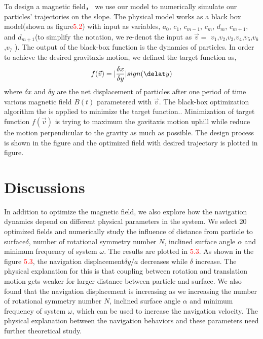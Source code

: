 To design a magnetic field， we use our model to numerically simulate our particles' trajectories on the slope. The physical model works as a black box model(shown as figure\textcolor{red}{5.2}) with input as variables, $a_0$, $c_1$, $c_{m-1}$, $c_{m}$, $d_{m}$, $c_{m+1}$, and $d_{m+1}$(to simplify the notation, we re-denot the input as $\vec{v}=$ $v_1$,$v_2$,$v_3$,$v_4$,$v_5$,$v_6$,$v_7$  ). The output of the black-box function is the dynamics of particles. In order to achieve the desired gravitaxis motion, we defined the target function as,
\begin{equation}
    f(\vec{v})=|\frac{\delta x}{\delta y}| sign(\delat y)
\end{equation}
where $\delta x$ and $\delta y$ are the net displacement of particles after one period of time various magnetic field $B(t)$ parametered with $\vec{v}$.
The black-box optimization algorithm the  is applied to minimize the target function.\cite{dou2019autonomous}. Minimization of target function $f(\vec{v})$ is trying to maximum the gavitaxis motion uphill while reduce the motion perpendicular to the gravity as much as possible. The design process is shown in the \textcolor{figure }{figure } and the optimized field with desired trajectory is plotted in  \textcolor{figure }{figure}.


 
\section{Discussions}
In addition to optimize the magnetic field, we also explore how the navigation dynamics depend on different physical parameters in the system. We select 20 optimized fields and numerically study the influence of distance from particle to surface$\delta$, number of  rotational symmetry number $N$, inclined surface angle $\alpha$ and  minimum frequency of system  $\omega$. The results are plotted in \textcolor{red}{5.3}. As shown in the figure \textcolor{red}{5.3}, the navigation displacement$\delta y/a$ decreases while $\delta$ increase. The physical explanation for this is that coupling between rotation and translation motion gets weaker for larger distance between particle and surface. We also found that the navigation displacement is increasing as we increasing the   number of  rotational symmetry number $N$, inclined surface angle $\alpha$ and  minimum frequency of system  $\omega$, which can be used to increase the navigation velocity. The physical explanation between the navigation behaviors and these parameters need further theoretical study. 



